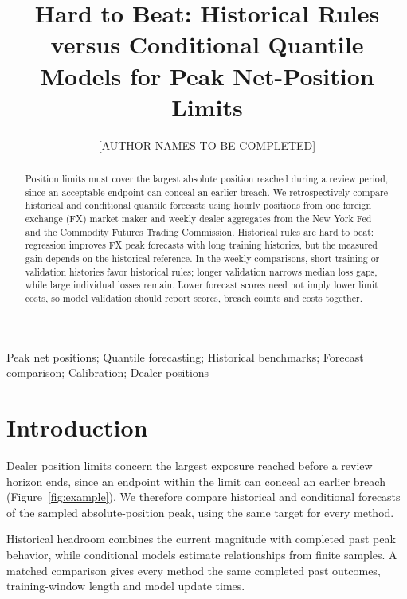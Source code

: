 \documentclass{rQUF2e}
\begin{document}
\title{Hard to Beat: Historical Rules versus Conditional Quantile Models for Peak Net-Position Limits}
\author{[AUTHOR NAMES TO BE COMPLETED]\\
}
\maketitle

\begin{abstract}Position limits must cover the largest absolute position reached during a review period, since an acceptable endpoint can conceal an earlier breach. We retrospectively compare historical and conditional quantile forecasts using hourly positions from one foreign exchange (FX) market maker and weekly dealer aggregates from the New York Fed and the Commodity Futures Trading Commission. Historical rules are hard to beat: regression improves FX peak forecasts with long training histories, but the measured gain depends on the historical reference. In the weekly comparisons, short training or validation histories favor historical rules; longer validation narrows median loss gaps, while large individual losses remain. Lower forecast scores need not imply lower limit costs, so model validation should report scores, breach counts and costs together.\end{abstract}

\begin{keywords}Peak net positions; Quantile forecasting; Historical benchmarks; Forecast comparison; Calibration; Dealer positions\end{keywords}
\begin{classcode}\end{classcode}

\section{Introduction}\label{sec:intro}

Dealer position limits concern the largest exposure reached before a review horizon ends, since an endpoint within the limit can conceal an earlier breach (Figure~\ref{fig:example}). We therefore compare historical and conditional forecasts of the sampled absolute-position peak, using the same target for every method.

Historical headroom combines the current magnitude with completed past peak behavior, while conditional models estimate relationships from finite samples. A matched comparison gives every method the same completed past outcomes, training-window length and model update times.
\end{document}
